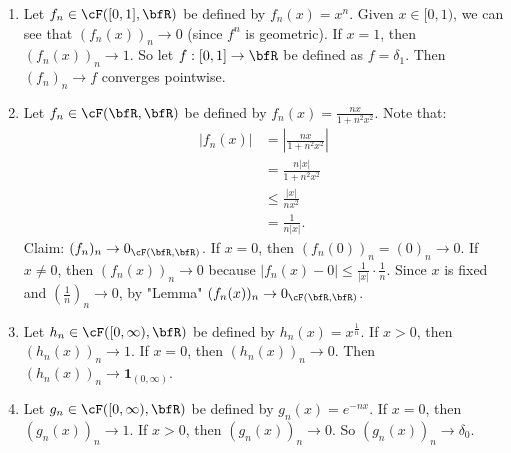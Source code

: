     \begin{example}
        \phantom{a}
        \begin{enumerate}[label = (\arabic*)]
            \item Let $f_n \in \cF([0,1],\bfR)$ be defined by $f_n(x) = x^n$. Given $x \in [0,1)$, we can see that $(f_n(x))_n \rightarrow 0$ (since $f^n$ is geometric). If $x = 1$, then $(f_n(x))_n \rightarrow 1$. So let $f: [0,1] \rightarrow \bfR$ be defined as $f = \delta_1$. Then $(f_n)_n \rightarrow f$ converges pointwise.
            \item Let $f_n \in \cF(\bfR,\bfR)$ be defined by $f_n(x) = \frac{nx}{1+n^2x^2}$. Note that:
                \begin{equation*}
                \begin{split}
                    |f_n(x)|
                    & = \left|\frac{nx}{1+n^2x^2}\right| \\
                    & = \frac{n|x|}{1 + n^2 x^2} \\
                    & \leq \frac{|x|}{nx^2} \\
                    & = \frac{1}{n|x|}. 
                \end{split}
                \end{equation*}
            Claim: $(f_n)_n \rightarrow 0_{\cF(\bfR, \bfR)}$. If $x = 0$, then $(f_n(0))_n = (0)_n \rightarrow 0$. If $x \neq 0$, then $(f_n(x))_n \rightarrow 0$ because $|f_n(x) - 0| \leq \frac{1}{|x|} \cdot \frac{1}{n}$. Since $x$ is fixed and $\left(\frac{1}{n}\right)_n \rightarrow 0$, by "Lemma" $(f_n(x))_n \rightarrow 0_{\cF(\bfR,\bfR)}$.
            \item Let $h_n \in \cF([0,\infty),\bfR)$ be defined by $h_n(x) = x^\frac{1}{n}$. If $x > 0$, then $(h_n(x))_n \rightarrow 1$. If $x = 0$, then $(h_n(x))_n \rightarrow 0$. Then $(h_n(x))_n \rightarrow \mathbf{1}_{(0,\infty)}$.
            \item Let $g_n \in \cF([0,\infty),\bfR)$ be defined by $g_n(x) = e^{-nx}$. If $x = 0$, then $(g_n(x))_n \rightarrow 1$. If $x > 0$, then $(g_n(x))_n \rightarrow 0$. So $(g_n(x))_n \rightarrow \delta_0$.
        \end{enumerate}
    \end{example}

